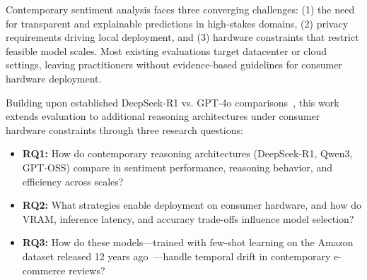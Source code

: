 \documentclass[conference]{IEEEtran}
\begin{document}
Contemporary sentiment analysis faces three converging challenges: (1) the need for transparent and explainable predictions in high-stakes domains, (2) privacy requirements driving local deployment, and (3) hardware constraints that restrict feasible model scales. 
Most existing evaluations target datacenter or cloud settings, leaving practitioners without evidence-based guidelines for consumer hardware deployment.

Building upon established DeepSeek-R1 vs. GPT-4o comparisons~\cite{huang2025explainable}, this work extends evaluation to additional reasoning architectures under consumer hardware constraints through three research questions:
\begin{itemize}[leftmargin=*,nosep]
    \item \textbf{RQ1:} How do contemporary reasoning architectures (DeepSeek-R1, Qwen3, GPT-OSS) compare in sentiment performance, reasoning behavior, and efficiency across scales?  
    \item \textbf{RQ2:} What strategies enable deployment on consumer hardware, and how do VRAM, inference latency, and accuracy trade-offs influence model selection?  
    \item \textbf{RQ3:} How do these models---trained with few-shot learning on the Amazon dataset released 12 years ago~\cite{mcauley2013hidden}---handle temporal drift in contemporary e-commerce reviews?  
\end{itemize}
\end{document}
